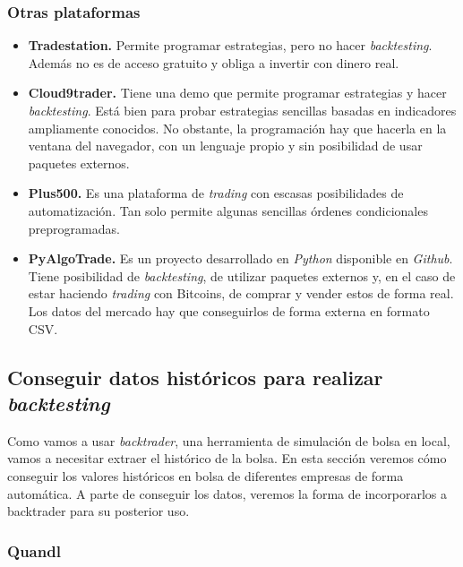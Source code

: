 		
		\subsubsection{Otras plataformas}

		\begin{itemize}
			\item \textbf{Tradestation.} Permite programar estrategias, pero no hacer \textit{backtesting}. Adem\'as no es de acceso gratuito y obliga a invertir con dinero real.
			
			\item \textbf{Cloud9trader.} Tiene una demo que permite programar estrategias y hacer \textit{backtesting}. Est\'a bien para probar estrategias sencillas basadas en indicadores ampliamente conocidos. No obstante, la programaci\'on hay que hacerla en la ventana del navegador, con un lenguaje propio y sin posibilidad de usar paquetes externos.
			
			\item \textbf{Plus500.} Es una plataforma de \textit{trading} con escasas posibilidades de automatizaci\'on. Tan solo permite algunas  sencillas \'ordenes condicionales preprogramadas.
			
			\item \textbf{PyAlgoTrade.} Es un proyecto desarrollado en \textit{Python} disponible en \textit{Github}. Tiene posibilidad de \textit{backtesting}, de utilizar paquetes externos y, en el caso de estar haciendo \textit{trading} con Bitcoins, de comprar y vender estos de forma real. Los datos del mercado hay que conseguirlos de forma externa en formato CSV.
		\end{itemize}
		
	
	\subsection{Conseguir datos hist\'oricos para realizar \textit{backtesting}}\label{sec:get_data}
		
		Como vamos a usar \textit{backtrader}, una herramienta de simulaci\'on de bolsa en local, vamos a necesitar extraer el hist\'orico de la bolsa. En esta secci\'on veremos c\'omo conseguir los valores hist\'oricos en bolsa de diferentes empresas de forma autom\'atica. A parte de conseguir los datos, veremos la forma de incorporarlos a backtrader para su posterior uso.
		
		\subsubsection{Quandl}
		

